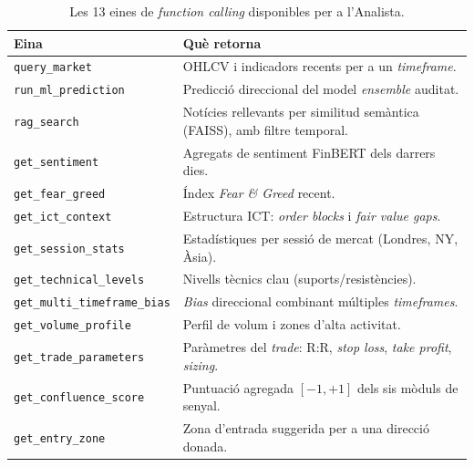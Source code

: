 \documentclass[10pt,twocolumn,a4paper]{article}
\begin{document}
\begin{table}[H]
\centering
\caption{Les 13 eines de \textit{function calling} disponibles per a l'Analista.}
\label{tab:eines}
\small
\begin{tabular}{@{}lL{9.5cm}@{}}
\toprule
\textbf{Eina} & \textbf{Què retorna} \\
\midrule
\texttt{query\_market}            & OHLCV i indicadors recents per a un \textit{timeframe}. \\
\texttt{run\_ml\_prediction}      & Predicció direccional del model \textit{ensemble} auditat. \\
\texttt{rag\_search}              & Notícies rellevants per similitud semàntica (FAISS), amb filtre temporal. \\
\texttt{get\_sentiment}           & Agregats de sentiment FinBERT dels darrers dies. \\
\texttt{get\_fear\_greed}         & Índex \textit{Fear \& Greed} recent. \\
\texttt{get\_ict\_context}        & Estructura ICT: \textit{order blocks} i \textit{fair value gaps}. \\
\texttt{get\_session\_stats}      & Estadístiques per sessió de mercat (Londres, NY, Àsia). \\
\texttt{get\_technical\_levels}   & Nivells tècnics clau (suports/resistències). \\
\texttt{get\_multi\_timeframe\_bias} & \textit{Bias} direccional combinant múltiples \textit{timeframes}. \\
\texttt{get\_volume\_profile}     & Perfil de volum i zones d'alta activitat. \\
\texttt{get\_trade\_parameters}   & Paràmetres del \textit{trade}: R:R, \textit{stop loss}, \textit{take profit}, \textit{sizing}. \\
\texttt{get\_confluence\_score}   & Puntuació agregada $[-1,+1]$ dels sis mòduls de senyal. \\
\texttt{get\_entry\_zone}         & Zona d'entrada suggerida per a una direcció donada. \\
\bottomrule
\end{tabular}
\end{table}
\end{document}
